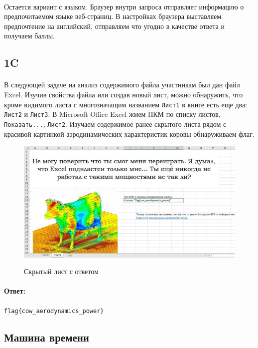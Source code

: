 \documentclass[12pt]{article}
\begin{document}
    \paragraph{}
	Остается вариант с языком.
	Браузер внутри запроса отправляет информацию о предпочитаемом языке веб-страниц.
	В настройках браузера выставляем предпочтение на английский, отправляем что угодно в качестве ответа и получаем баллы.

    \subsection{1C}
	\paragraph{}
    В следующей задаче на анализ содержимого файла участникам был дан файл Excel.
	Изучив свойства файла или создав новый лист, можно обнаружить,
	что кроме видимого листа с многозначащим названием \verb|Лист1| в книге есть еще два: \verb|Лист2| и \verb|Лист3|.
	В Microsoft Office Excel жмем ПКМ по списку листов, \verb|Показать...|, \verb|Лист2|.
	Изучаем содержимое ранее скрытого листа рядом с красивой картинкой аэродинамических характеристик коровы
	обнаруживаем флаг.
    \begin{figure}[H]
        \centering
        \includegraphics[width=12cm]{task11}
        \label{fig:task11}
        \caption{Скрытый лист с ответом}
    \end{figure}
    \paragraph{Ответ:}
    \verb|flag{cow_aerodynamics_power}|

    \subsection{Машина времени}
\end{document}
